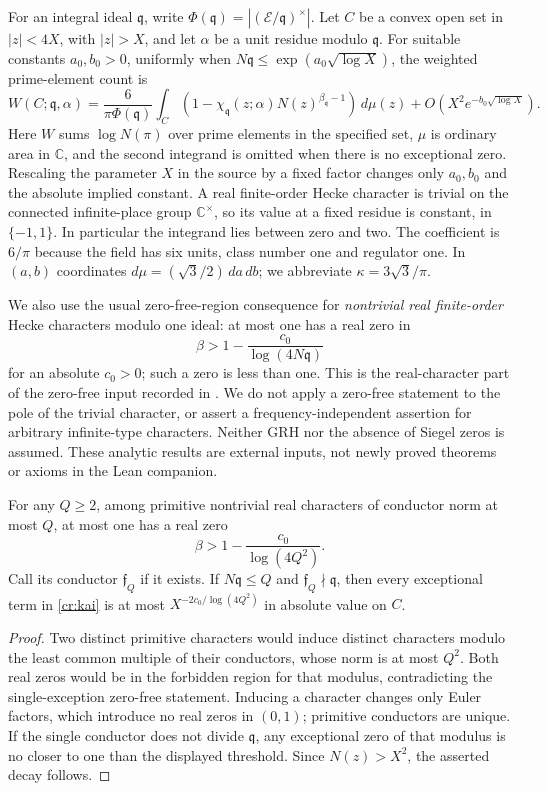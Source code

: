 For an integral ideal $\mathfrak q$, write
$\Phi(\mathfrak q)=| (\mathcal E/\mathfrak q)^\times |$.
Let $C$ be a convex open set in $|z|<4X$, with $|z|>X$, and let
$\alpha$ be a unit residue modulo $\mathfrak q$. For suitable constants
$a_0,b_0>0$, uniformly when
$N\mathfrak q\le\exp(a_0\sqrt{\log X})$, the weighted prime-element count is
\begin{equation}\label{cr:kai}
 W(C;\mathfrak q,\alpha)
 =\frac{6}{\pi\Phi(\mathfrak q)}
 \int_C(1-\chi_{\mathfrak q}(z;\alpha)N(z)^{\beta_{\mathfrak q}-1})\,d\mu(z)
 +O(X^2e^{-b_0\sqrt{\log X}}).
\end{equation}
Here $W$ sums $\log N(\pi)$ over prime elements in the specified set, $\mu$
is ordinary area in $\mathbb C$, and the second integrand is omitted when
there is no exceptional zero. Rescaling the parameter $X$ in the source by a
fixed factor changes only $a_0,b_0$ and the absolute implied constant.
A real finite-order Hecke character is trivial on the connected infinite-place
group $\mathbb C^\times$, so its value at a fixed residue is constant, in
$\{-1,1\}$. In particular the integrand lies between zero and two.
The coefficient is $6/\pi$ because the field has six units, class number one
and regulator one. In $(a,b)$ coordinates $d\mu=(\sqrt3/2)\,da\,db$;
we abbreviate $\kappa=3\sqrt3/\pi$.

We also use the usual zero-free-region consequence for \emph{nontrivial real
finite-order} Hecke characters modulo one ideal: at most one has a real zero
in
\[
 \beta>1-\frac{c_0}{\log(4N\mathfrak q)}
\]
for an absolute $c_0>0$; such a zero is less than one. This is the real-character
part of the zero-free input recorded in \cite[Theorem 2.3.1]{CRKai2023}. We do
not apply a zero-free statement to the pole of the trivial character, or
assert a frequency-independent assertion for arbitrary infinite-type
characters. Neither GRH nor the absence of Siegel zeros is assumed.
These analytic results are external inputs, not newly proved theorems or
axioms in the Lean companion.

\begin{lemma}\label{cr:exception}
For any $Q\ge2$, among primitive nontrivial real characters of conductor norm
at most $Q$, at most one has a real zero
\[
 \beta>1-\frac{c_0}{\log(4Q^2)}.
\]
Call its conductor $\mathfrak f_Q$ if it exists. If
$N\mathfrak q\le Q$ and $\mathfrak f_Q\nmid\mathfrak q$, then every exceptional
term in \eqref{cr:kai} is at most
$X^{-2c_0/\log(4Q^2)}$ in absolute value on $C$.
\end{lemma}
\begin{proof}
Two distinct primitive characters would induce distinct characters modulo the
least common multiple of their conductors, whose norm is at most $Q^2$.
Both real zeros would be in the forbidden region for that modulus, contradicting
the single-exception zero-free statement. Inducing a character changes only
Euler factors, which introduce no real zeros in $(0,1)$; primitive conductors
are unique. If the single conductor does not divide $\mathfrak q$, any
exceptional zero of that modulus is no closer to one than the displayed
threshold. Since $N(z)>X^2$, the asserted decay follows.
\end{proof}

